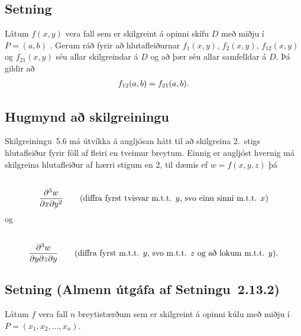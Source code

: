 \documentclass[a4paper,10pt,icelandic]{sphinxmanual}
\begin{document}
\subsection{Setning}
\label{Kafli2:id15}
Látum \(f(x,y)\) vera fall sem er skilgreint á opinni skífu
\(D\) með miðju í \(P=(a,b)\) . Gerum ráð fyrir að
hlutafleiðurnar \(f_1(x,y)\), \(f_2(x,y)\), \(f_{12}(x,y)\)
og \(f_{21}(x,y)\) séu allar skilgreindar á \(D\) og að þær séu
allar samfelldar á \(D\). Þá gildir að
\begin{gather}
\begin{split}\displaystyle f_{12}(a,b)=f_{21}(a,b).\end{split}\notag
\end{gather}

\subsection{Hugmynd að skilgreiningu}
\label{Kafli2:hugmynd-a-skilgreiningu}
Skilgreiningu 5.6 má útvíkka á augljósan hátt til að skilgreina 2. stigs
hlutafleiður fyrir föll af fleiri en tveimur breytum. Einnig er augljóst
hvernig má skilgreina hlutafleiður af hærri stigum en 2, til dæmis ef
\(w=f(x,y,z)\) þá
\begin{gather}
\begin{split}\displaystyle\end{split}\notag\\\begin{split}\frac{\partial^3 w}{\partial x\partial y^2} \quad\quad\mbox{(diffra
    fyrst tvisvar m.t.t. }y\mbox{, svo einu sinni m.t.t. } x\mbox{)}\end{split}\notag
\end{gather}
og
\begin{gather}
\begin{split}\displaystyle\end{split}\notag\\\begin{split}\frac{\partial^3 w}{\partial y\partial z\partial y} \quad\quad\mbox{(diffra
    fyrst m.t.t. } y\mbox{, svo m.t.t. } z
\mbox{ og að lokum m.t.t. }y\mbox{)}.\end{split}\notag
\end{gather}

\subsection{Setning (Almenn útgáfa af Setningu 2.13.2)}
\label{Kafli2:setning-almenn-utgafa-af-setningu-2-13-2}
Látum \(f\) vera fall \(n\) breytistærðum sem er skilgreint á
opinni kúlu með miðju í \(P=(x_1, x_2,\ldots, x_n)\).
\end{document}
